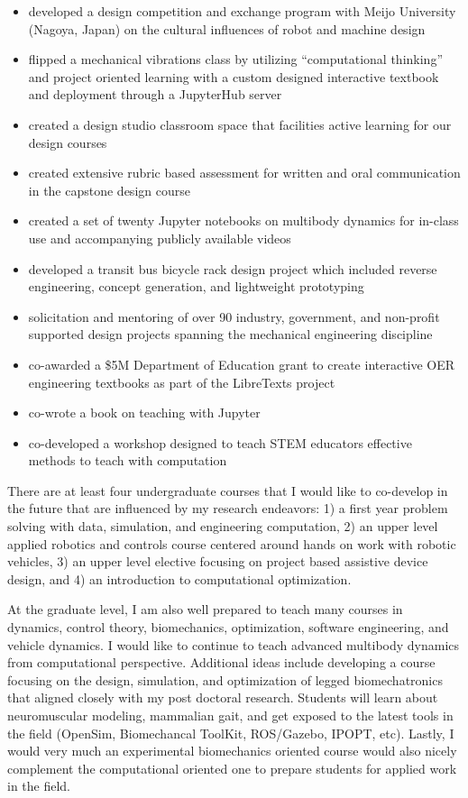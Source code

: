\documentclass{article}
\begin{document}
\begin{itemize}
  \setlength\itemsep{0.1em}
  \item developed a design competition and exchange program with Meijo
    University (Nagoya, Japan) on the cultural influences of robot and machine
    design
  \item flipped a mechanical vibrations class by utilizing ``computational
    thinking'' and project oriented learning with a custom designed interactive
    textbook and deployment through a JupyterHub server
  \item created a design studio classroom space that facilities active learning
    for our design courses
  \item created extensive rubric based assessment for written and oral
    communication in the capstone design course
  \item created a set of twenty Jupyter notebooks on multibody dynamics for
    in-class use and accompanying publicly available videos
  \item developed a transit bus bicycle rack design project which included
    reverse engineering, concept generation, and lightweight prototyping
  \item solicitation and mentoring of over 90 industry, government, and
    non-profit supported design projects spanning the mechanical engineering
    discipline
  \item co-awarded a \$5M Department of Education grant to create interactive
    OER engineering textbooks as part of the LibreTexts project
  \item co-wrote a book on teaching with Jupyter
  \item co-developed a workshop designed to teach STEM educators effective
    methods to teach with computation
\end{itemize}

There are at least four undergraduate courses that I would like to co-develop
in the future that are influenced by my research endeavors: 1) a first year
problem solving with data, simulation, and engineering computation, 2) an upper
level applied robotics and controls course centered around hands on work with
robotic vehicles, 3) an upper level elective focusing on project based
assistive device design, and 4) an introduction to computational optimization.

At the graduate level, I am also well prepared to teach many courses in
dynamics, control theory, biomechanics, optimization, software engineering, and
vehicle dynamics. I would like to continue to teach advanced multibody dynamics
from computational perspective. Additional ideas include developing a course
focusing on the design, simulation, and optimization of legged biomechatronics
that aligned closely with my post doctoral research. Students will learn about
neuromuscular modeling, mammalian gait, and get exposed to the latest tools in
the field (OpenSim, Biomechancal ToolKit, ROS/Gazebo, IPOPT, etc). Lastly, I
would very much an experimental biomechanics oriented course would also nicely
complement the computational oriented one to prepare students for applied work
in the field.
\end{document}
